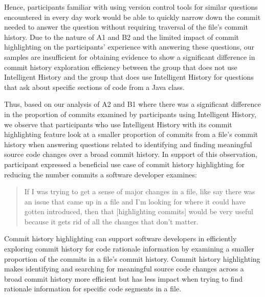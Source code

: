 \begin{center}
\end{center}

Hence, participants familiar with using version control tools for similar questions encountered in every day work would be able to quickly narrow down the commit needed to answer the question without requiring traversal of the file's commit history.
Due to the nature of A1 and B2 and the limited impact of commit highlighting on the participants' experience with answering these questions,
our samples are insufficient for obtaining evidence to show a significant difference in commit history exploration efficiency between the group that does not use Intelligent History and the group that does use Intelligent History for questions that ask about specific sections of code from a Java class.

Thus, based on our analysis of A2 and B1 where there was a significant difference in 
the proportion of commits examined by participants using Intelligent History, 
we observe that participants who use Intelligent History with its commit highlighting feature 
look at a smaller proportion of commits from a file's commit history when answering questions related to
identifying and finding meaningful source code changes over a broad commit history.
In support of this observation, 
participant  expressed a beneficial use case of commit history highlighting 
for reducing the number commits a software developer examines:

\begin{quote}
  If I was trying to get a sense of major changes in a file, like say there was an issue that came up in a file and I’m looking for where it could have gotten introduced, 
  then that [highlighting commits] would be very useful because it gets rid of all the changes that don’t matter. 
\end{quote}

\begin{summary}[RQ2]
  Commit history highlighting can support software developers in efficiently 
  exploring commit history for code rationale information 
  by examining a smaller proportion of the commits in a file's commit history.
  Commit history highlighting makes identifying and searching for meaningful source code changes 
  across a broad commit history more efficient but has less impact when trying to find rationale information for specific code segments in a file.
\end{summary}

